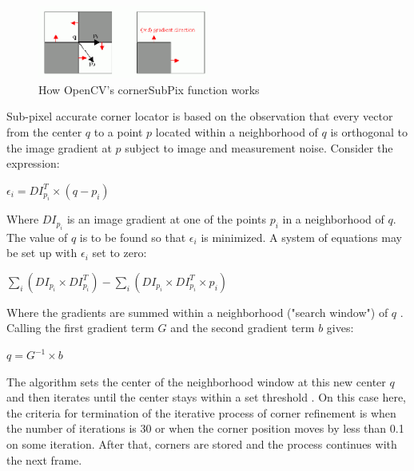 \documentclass[msc, a4paper, classic, en]{ufbathesis}
\begin{document}
\begin{figure}
\centering
\includegraphics[width=0.5\textwidth]{images/cornersubpix.png}
\caption{How OpenCV's cornerSubPix function works \cite{opencvfd}}
\label{fig:cornersubpix}
\end{figure}

Sub-pixel accurate corner locator is based on the observation that every vector from the center $q$ to a point $p$ located within a neighborhood of $q$ is orthogonal to the image gradient at $p$ subject to image and measurement noise. Consider the expression:

\begin{center}
$\epsilon_i = DI_{p_i}^T \times (q - p_i)$
\end{center}

Where $DI_{p_i}$ is an image gradient at one of the points $p_i$ in a neighborhood of $q$. The value of $q$ is to be found so that $\epsilon_i$ is minimized. A system of equations may be set up with $\epsilon_i$ set to zero:

\begin{center}
$\sum_{i}{(DI_{p_i} \times DI_{p_i}^T)} - \sum_{i}{(DI_{p_i} \times DI_{p_i}^T \times p_i)}$
\end{center}

Where the gradients are summed within a neighborhood ("search window") of $q$ . Calling the first gradient term $G$ and the second gradient term $b$ gives:

\begin{center}
$q = G^{-1} \times b$
\end{center}

The algorithm sets the center of the neighborhood window at this new center $q$ and then iterates until the center stays within a set threshold \cite{opencvfd}. On this case here, the criteria for termination of the iterative process of corner refinement is when the number of iterations is 30 or when the corner position moves by less than 0.1 on some iteration. After that, corners are stored and the process continues with the next frame.
\end{document}
